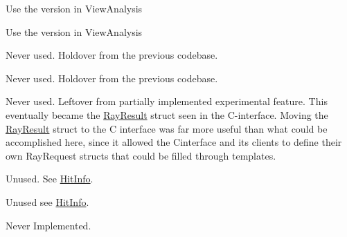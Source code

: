 \begin{DoxyRefList}
Use the version in View\+Analysis  
\item[Member \mbox{\hyperlink{a00277_a6df9ff0fb8610752d548354b3e6600e0}{HF\+::Ray\+Tracer\+::gen\+Fibbonacci\+Rays}} (int numrays)]\label{a00263__deprecated000015}%
%
Use the version in View\+Analysis  
\item[Member \mbox{\hyperlink{a01163_acc1fc8eaa0139696ec31362384a37d5f}{HF\+::Ray\+Tracer\+::Embree\+Ray\+Tracer\+::Fire\+Requests}} (std\+::vector$<$ Full\+Ray\+Request $>$ \&requests, bool parallel=true)]\label{a00263__deprecated000016}%
%
Never used. Holdover from the previous codebase.  
\item[Member \mbox{\hyperlink{a01163_a2fd625932160afeebd0169967d733217}{HF\+::Ray\+Tracer\+::Embree\+Ray\+Tracer\+::Fire\+Occlusion\+Requests}} (std\+::vector$<$ Full\+Ray\+Request $>$ \&requests, bool parallel=true)]\label{a00263__deprecated000017}%
%
Never used. Holdover from the previous codebase.  
\item[Class \mbox{\hyperlink{a00277}{HF\+::Ray\+Tracer\+::Hit\+Info}} ]\label{a00263__deprecated000018}%
%
Never used. Leftover from partially implemented experimental feature. This eventually became the \mbox{\hyperlink{a01219}{Ray\+Result}} struct seen in the C-\/interface. Moving the \mbox{\hyperlink{a01219}{Ray\+Result}} struct to the C interface was far more useful than what could be accomplished here, since it allowed the Cinterface and its clients to define their own Ray\+Request structs that could be filled through templates.  
\item[Class \mbox{\hyperlink{a01175}{HF\+::Ray\+Tracer\+::Ray\+Request\+Lite}} ]\label{a00263__deprecated000019}%
%
Unused. See \mbox{\hyperlink{a00277_a01171}{Hit\+Info}}.  
\item[Class \mbox{\hyperlink{a01179}{HF\+::Ray\+Tracer\+::Ray\+Request\+Collection}} ]\label{a00263__deprecated000020}%
%
Unused see \mbox{\hyperlink{a00277_a01171}{Hit\+Info}}.  
\item[Member \mbox{\hyperlink{a01199_a3640461d4c1d1ff55dd200fd5670bf9c}{HF\+::Spatial\+Structures\+::Graph\+::Update\+I\+Ds}} (int new\+\_\+id)]\label{a00263__deprecated000021}%
%
Never Implemented.  
\item[Member \mbox{\hyperlink{a01199_a313eb2f8a0f5edcb2bd4b6f6b03af428}{HF\+::Spatial\+Structures\+::Graph\+::Generate\+Cross\+Slope}} ()]\label{a00263__deprecated000022}%

\end{DoxyRefList}
